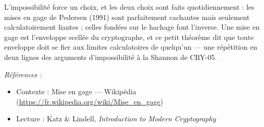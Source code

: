 \documentclass[11pt]{article}
\newenvironment{refs}{\par\small\noindent\emph{Références :}\begin{itemize}\setlength\itemsep{0pt}}{\end{itemize}\normalsize}
\begin{document}
\noindent L'impossibilité force un choix, et les deux choix sont faits
quotidiennement : les mises en gage de Pedersen (1991) sont parfaitement cachantes mais
seulement calculatoirement liantes ; celles fondées sur le hachage font l'inverse. Une mise
en gage est l'enveloppe scellée du cryptographe, et ce petit théorème dit que toute enveloppe
doit se fier aux limites calculatoires de quelqu'un --- une répétition en deux lignes des
arguments d'impossibilité à la Shannon de CRY-05.

\begin{refs}
\item Contexte : Mise en gage --- Wikipédia (\url{https://fr.wikipedia.org/wiki/Mise_en_gage})
\item Lecture : Katz \& Lindell, \textit{Introduction to Modern Cryptography}
\end{refs}

\bigskip
\end{document}
